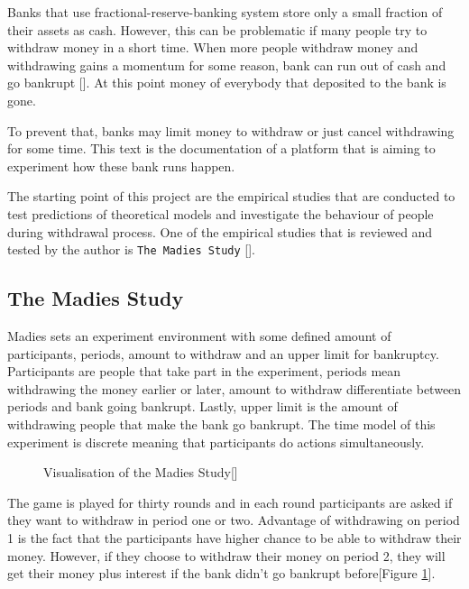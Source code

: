 Banks that use fractional-reserve-banking system store only a small fraction of their assets as cash. However, this can be problematic if many people try to withdraw money in a short time. When more people withdraw money and withdrawing gains a momentum for some reason, bank can run out of cash and go bankrupt [\cite{Diamond2007}]. At this point money of everybody that deposited to the bank is gone. 

To prevent that, banks may limit money to withdraw or just cancel withdrawing for some time. This text is the documentation of a platform that is aiming to experiment how these bank runs happen.

The starting point of this project are the empirical studies that are conducted to test predictions of theoretical models and investigate the behaviour of people during withdrawal process. One of the empirical studies that is reviewed and tested by the author is  \verb|The Madies Study| [\cite{Madies2007}].

\subsection{The Madies Study}\label{sub:madies}

Madies sets an experiment environment with some defined amount of participants, periods, amount to withdraw and an upper limit for bankruptcy. Participants are  people that take part in the experiment, periods mean withdrawing the money earlier or later, amount to withdraw differentiate between periods and bank going bankrupt. Lastly, upper limit is the amount of withdrawing people that make the bank go bankrupt. The time model of this experiment is discrete meaning that participants do actions simultaneously.

\begin{figure}[h]
	\centerline{}
	\caption{Visualisation of the Madies Study[\cite{Madies2007}]}
	\label{tab:tabellenreferenz2}
	
\end{figure}


The game is played for thirty rounds and in each round participants are asked if they want to withdraw in period one or two. Advantage of withdrawing on period 1 is the fact that the participants have higher chance to be able to withdraw their money. However, if they choose to withdraw their money on period 2, they will get their money plus interest if the bank didn't go bankrupt before[Figure \ref{tab:tabellenreferenz2}].

